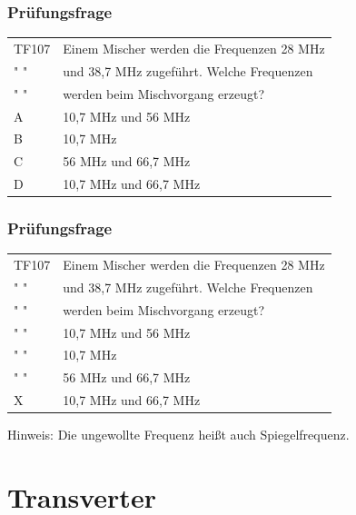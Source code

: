 \begin{frame}
    \frametitle{Prüfungsfrage}

    \begin{center}
    \begin{tabular}{l||l}\hline
        TF107 &Einem Mischer werden die Frequenzen 28 MHz\\
         " "  &und 38,7 MHz zugeführt. Welche Frequenzen\\
         " "  &werden beim Mischvorgang erzeugt?\\ \hline\hline
         A & 10,7 MHz und 56 MHz \\\hline
         B & 10,7 MHz \\\hline
         C & 56 MHz und 66,7 MHz \\ \hline
         D & 10,7 MHz und 66,7 MHz\\\hline
    \end{tabular}
 	\end{center}
\end{frame}

\begin{frame}
    \frametitle{Prüfungsfrage}
    \begin{center}
    \begin{tabular}{l||l}\hline
        TF107 &Einem Mischer werden die Frequenzen 28 MHz\\
         " "  &und 38,7 MHz zugeführt. Welche Frequenzen\\
         " "  &werden beim Mischvorgang erzeugt? \\ \hline\hline
         " " & 10,7 MHz und 56 MHz \\\hline
         " " & 10,7 MHz \\\hline
         " " & 56 MHz und 66,7 MHz \\ \hline
         X & 10,7 MHz und 66,7 MHz\\\hline
    \end{tabular}
    Hinweis: Die ungewollte Frequenz heißt auch Spiegelfrequenz.
 	\end{center}
\end{frame}

\section*{Transverter}

